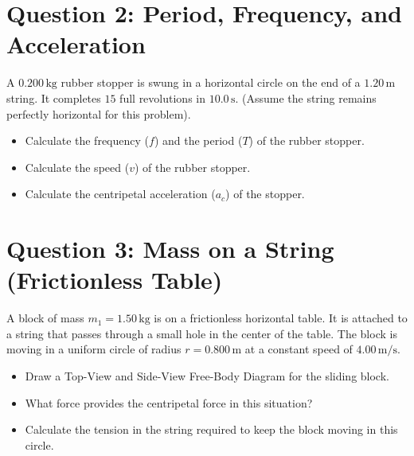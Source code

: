 \documentclass[12pt]{article}
\begin{document}
\vspace{1cm}

\section*{Question 2: Period, Frequency, and Acceleration}

A $0.200 \, \text{kg}$ rubber stopper is swung in a horizontal circle on the end of a $1.20 \, \text{m}$ string. It completes $15$ full revolutions in $10.0 \, \text{s}$. (Assume the string remains perfectly horizontal for this problem).

\begin{itemize}
\item[(a)] Calculate the frequency ($f$) and the period ($T$) of the rubber stopper.
\vspace{5cm}

\item[(b)] Calculate the speed ($v$) of the rubber stopper.
\vspace{5cm}

\item[(c)] Calculate the centripetal acceleration ($a_c$) of the stopper.
\vspace{6cm}

\end{itemize}

\newpage

\section*{Question 3: Mass on a String (Frictionless Table)}

A block of mass $m_1 = 1.50 \, \text{kg}$ is on a frictionless horizontal table. It is attached to a string that passes through a small hole in the center of the table. The block is moving in a uniform circle of radius $r = 0.800 \, \text{m}$ at a constant speed of $4.00 \, \text{m/s}$.

\begin{itemize}
\item[(a)] Draw a Top-View and Side-View Free-Body Diagram for the sliding block.
\vspace{5cm}

\item[(b)] What force provides the centripetal force in this situation?
\vspace{6cm}

\item[(c)] Calculate the tension in the string required to keep the block moving in this circle.
\vspace{6cm}

\end{itemize}
\end{document}
